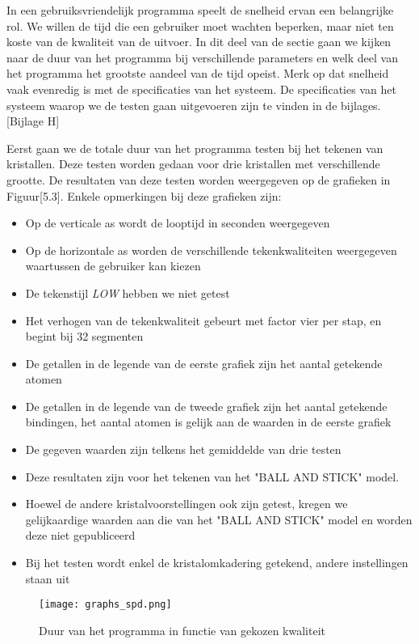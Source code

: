 In een gebruiksvriendelijk programma speelt de snelheid ervan een belangrijke rol. We willen de tijd die een gebruiker moet wachten beperken, maar niet ten koste van de kwaliteit van de uitvoer. In dit deel van de sectie gaan we kijken naar de duur van het programma bij verschillende parameters en welk deel van het programma het grootste aandeel van de tijd opeist. Merk op dat snelheid vaak evenredig is met de specificaties van het systeem. De specificaties van het systeem waarop we de testen gaan uitgevoeren zijn te vinden in de bijlages.[Bijlage H]  
\par
Eerst gaan we de totale duur van het programma testen bij het tekenen van kristallen. Deze testen worden gedaan voor drie kristallen met verschillende grootte. De resultaten van deze testen worden weergegeven op de grafieken in Figuur[5.3]. Enkele opmerkingen bij deze grafieken zijn:
\begin{itemize}
\item Op de verticale as wordt de looptijd in seconden weergegeven
\item Op de horizontale as worden de verschillende tekenkwaliteiten weergegeven waartussen de gebruiker kan kiezen 
\item De tekenstijl \textit{LOW} hebben we niet getest
\item Het verhogen van de tekenkwaliteit gebeurt met factor vier per stap, en begint bij 32 segmenten
\item De getallen in de legende van de eerste grafiek zijn het aantal getekende atomen
\item De getallen in de legende van de tweede grafiek zijn het aantal getekende bindingen, het aantal atomen is gelijk aan de waarden in de eerste grafiek 
\item De gegeven waarden zijn telkens het gemiddelde van drie testen 
\item Deze resultaten zijn voor het tekenen van het "BALL AND STICK" model.
\item Hoewel de andere kristalvoorstellingen ook zijn getest, kregen we gelijkaardige waarden aan die van het "BALL AND STICK" model en worden deze niet gepubliceerd
\item Bij het testen wordt enkel de kristalomkadering getekend, andere instellingen staan uit 

\end{itemize}

\begin{figure}[H]
\begin{center}
\texttt{[image: graphs\_spd.png]}
\caption{Duur van het programma in functie van gekozen kwaliteit}
\end{center}
\end{figure}

